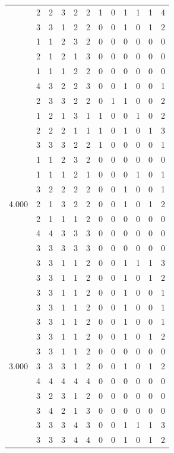 \documentclass[]{msu-thesis}
\theoremstyle{definition}
\theoremstyle{definition}
\theoremstyle{definition}
\theoremstyle{remark}
\begin{document}
\begin{table}
{\begin{tabular}[t]{rrrrrrrrrrrr}
 & 2 & 2 & 3 & 2 & 2 & 1 & 0 & 1 & 1 & 1 & 4\\
 & 3 & 3 & 1 & 2 & 2 & 0 & 0 & 1 & 0 & 1 & 2\\
 & 1 & 1 & 2 & 3 & 2 & 0 & 0 & 0 & 0 & 0 & 0\\
 & 2 & 1 & 2 & 1 & 3 & 0 & 0 & 0 & 0 & 0 & 0\\
 & 1 & 1 & 1 & 2 & 2 & 0 & 0 & 0 & 0 & 0 & 0\\
 & 4 & 3 & 2 & 2 & 3 & 0 & 0 & 1 & 0 & 0 & 1\\
 & 2 & 3 & 3 & 2 & 2 & 0 & 1 & 1 & 0 & 0 & 2\\
 & 1 & 2 & 1 & 3 & 1 & 1 & 0 & 0 & 1 & 0 & 2\\
 & 2 & 2 & 2 & 1 & 1 & 1 & 0 & 1 & 0 & 1 & 3\\
 & 3 & 3 & 3 & 2 & 2 & 1 & 0 & 0 & 0 & 0 & 1\\
 & 1 & 1 & 2 & 3 & 2 & 0 & 0 & 0 & 0 & 0 & 0\\
 & 1 & 1 & 1 & 2 & 1 & 0 & 0 & 0 & 1 & 0 & 1\\
 & 3 & 2 & 2 & 2 & 2 & 0 & 0 & 1 & 0 & 0 & 1\\
4.000 & 2 & 1 & 3 & 2 & 2 & 0 & 0 & 1 & 0 & 1 & 2\\
 & 2 & 1 & 1 & 1 & 2 & 0 & 0 & 0 & 0 & 0 & 0\\
 & 4 & 4 & 3 & 3 & 3 & 0 & 0 & 0 & 0 & 0 & 0\\
 & 3 & 3 & 3 & 3 & 3 & 0 & 0 & 0 & 0 & 0 & 0\\
 & 3 & 3 & 1 & 1 & 2 & 0 & 0 & 1 & 1 & 1 & 3\\
 & 3 & 3 & 1 & 1 & 2 & 0 & 0 & 1 & 0 & 1 & 2\\
 & 3 & 3 & 1 & 1 & 2 & 0 & 0 & 1 & 0 & 0 & 1\\
 & 3 & 3 & 1 & 1 & 2 & 0 & 0 & 1 & 0 & 0 & 1\\
 & 3 & 3 & 1 & 1 & 2 & 0 & 0 & 1 & 0 & 0 & 1\\
 & 3 & 3 & 1 & 1 & 2 & 0 & 0 & 1 & 0 & 1 & 2\\
 & 3 & 3 & 1 & 1 & 2 & 0 & 0 & 0 & 0 & 0 & 0\\
3.000 & 3 & 3 & 3 & 1 & 2 & 0 & 0 & 1 & 0 & 1 & 2\\
 & 4 & 4 & 4 & 4 & 4 & 0 & 0 & 0 & 0 & 0 & 0\\
 & 3 & 2 & 3 & 1 & 2 & 0 & 0 & 0 & 0 & 0 & 0\\
 & 3 & 4 & 2 & 1 & 3 & 0 & 0 & 0 & 0 & 0 & 0\\
 & 3 & 3 & 3 & 4 & 3 & 0 & 0 & 1 & 1 & 1 & 3\\
 & 3 & 3 & 3 & 4 & 4 & 0 & 0 & 1 & 0 & 1 & 2\\

\end{tabular}}
\end{table}
\end{document}
